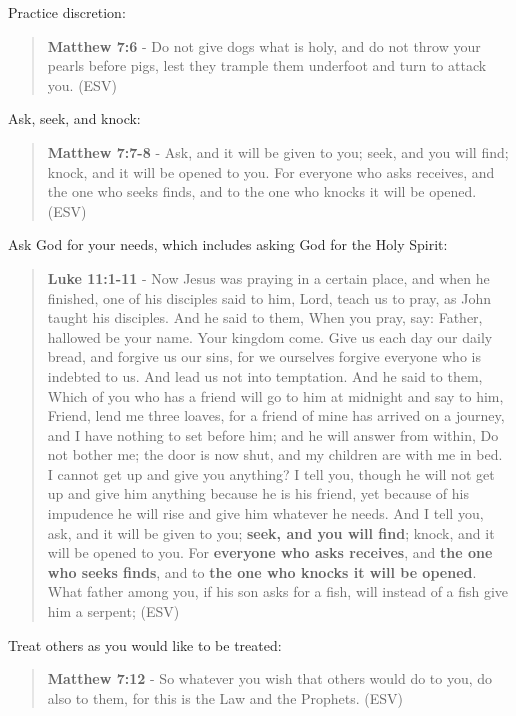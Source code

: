 \documentclass[11pt]{article}
\begin{document}
Practice discretion:

\begin{quote}
\textbf{Matthew 7:6} - Do not give dogs what is holy, and do not throw your pearls before pigs, lest they trample them underfoot and turn to attack you. (ESV)
\end{quote}

Ask, seek, and knock:

\begin{quote}
\textbf{Matthew 7:7-8} - Ask, and it will be given to you; seek, and you will find; knock, and it will be opened to you. For everyone who asks receives, and the one who seeks finds, and to the one who knocks it will be opened. (ESV)
\end{quote}

Ask God for your needs, which includes asking God for the Holy Spirit:

\begin{quote}
\textbf{Luke 11:1-11} - Now Jesus was praying in a certain place, and when he finished, one of his disciples said to him, Lord, teach us to pray, as John taught his disciples. And he said to them, When you pray, say: Father, hallowed be your name. Your kingdom come. Give us each day our daily bread, and forgive us our sins, for we ourselves forgive everyone who is indebted to us. And lead us not into temptation. And he said to them, Which of you who has a friend will go to him at midnight and say to him, Friend, lend me three loaves, for a friend of mine has arrived on a journey, and I have nothing to set before him; and he will answer from within, Do not bother me; the door is now shut, and my children are with me in bed. I cannot get up and give you anything? I tell you, though he will not get up and give him anything because he is his friend, yet because of his impudence he will rise and give him whatever he needs. And I tell you, ask, and it will be given to you; \textbf{seek, and you will find}; knock, and it will be opened to you. For \textbf{everyone who asks receives}, and \textbf{the one who seeks finds}, and to \textbf{the one who knocks it will be opened}. What father among you, if his son asks for a fish, will instead of a fish give him a serpent; (ESV)
\end{quote}

Treat others as you would like to be treated:

\begin{quote}
\textbf{Matthew 7:12} - So whatever you wish that others would do to you, do also to them, for this is the Law and the Prophets. (ESV)
\end{quote}
\end{document}
